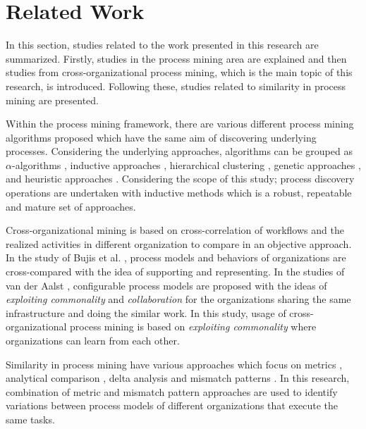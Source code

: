 \section{Related Work}
\label{sec:relatedwork}

In this section, studies related to the work presented in this research are summarized. Firstly, studies in the process mining area are explained and then studies from cross-organizational process mining, which is the main topic of this research, is introduced. Following these, studies related to similarity in process mining are presented.

Within the process mining framework, there are various different process mining algorithms proposed which have the same aim of discovering underlying processes. Considering the underlying approaches, algorithms can be grouped as $\alpha$-algorithms \cite{van2004workflow,de2004process}, inductive approaches \cite{herbst1998integrating,herbst2000dealing}, hierarchical clustering \cite{greco2005mining}, genetic approaches \cite{van2005genetic,esgin2010hybrid}, and heuristic approaches \cite{esgin2009hybrid}. Considering the scope of this study; process discovery operations are undertaken with inductive methods which is a robust, repeatable and mature set of approaches.

Cross-organizational mining is based on cross-correlation of workflows and the realized activities in different organization to compare in an objective approach. In the study of Bujis et al. \cite{buijs2012towards}, process models and behaviors of organizations are cross-compared with the idea of supporting and representing. In the studies of van der Aalst \cite{van2011business,van2011intra}, configurable process models are proposed with the ideas of \textit{exploiting commonality} and \textit{collaboration} for the organizations sharing the same infrastructure and doing the similar work. In this study, usage of cross-organizational process mining is based on \textit{exploiting commonality} where organizations can learn from each other.

Similarity in process mining have various approaches which focus on metrics \cite{dijkman2011similarity}, analytical comparison \cite{buijs2014comparing}, delta analysis \cite{esgin2011delta,esgin2013sequence} and mismatch patterns \cite{dijkman2007mismatch}. In this research, combination of metric and mismatch pattern approaches are used to identify variations between process models of different organizations that execute the same tasks.